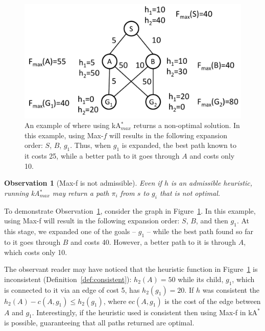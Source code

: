\documentclass{aicom2e}
\newtheorem{observation}{Observation}
\newcommand{\kastar}{kA$^*$}
\newcommand{\kastarmax}{kA$^*_{max}$}
\newcommand{\maxf}{Max-f}
\begin{document}
 
 \begin{figure}
 \includegraphics[width=\columnwidth]{max-bad_cropped.pdf}      
 \caption{An example of where using \kastarmax{} returns a non-optimal solution. In this example, 
 using Max-$f$ will results in the following expansion order: $S$, $B$, $g_1$. 
 Thus, when $g_1$ is expanded, the best path known to it costs 25, while a 
 better path to it goes through $A$ and costs only 10.}
 \label{fig:max-bad}
 \end{figure}
 
 \begin{observation}[\maxf{} is not admissible]
 	Even if $h$ is an admissible heuristic, 
 	running \kastarmax{} may return a path $\pi_i$ from $s$ to $g_i$ that is not optimal. 
 	\label{obs:max-f-inadmissible}
 \end{observation}
To demonstrate Observation~\ref{obs:max-f-inadmissible}, consider the graph in Figure~\ref{fig:max-bad}.
 In this example, using \maxf{} will result in the following expansion order: $S$, $B$, and then $g_1$. At this stage, we expanded one of the goals -- $g_1$ -- while the best path found so far to it goes through $B$ and costs 40. However, a better path to it is through $A$, which costs only 10.
 
 
  The observant reader may have noticed that the heuristic function in Figure~\ref{fig:max-bad} is inconsistent (Definition~\ref{def:consistent}): $h_2(A)=50$ while its child, $g_1$, which is connected to it via an edge of cost 5, has $h_2(g_1)=20$. If $h$ was consistent the $h_2(A)-c(A,g_1)\leq h_2(g_1)$, where e$c(A,g_1)$ is the cost of the edge between $A$ and $g_1$. 
  Interestingly, if the heuristic used is consistent then using \maxf{} in \kastar{} is possible, guaranteeing that all paths returned are optimal. %
 
\end{document}
